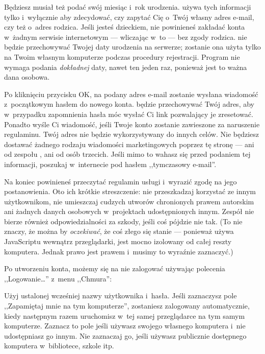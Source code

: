 \documentclass[a4paper]{report}
\begin{document}
Będziesz musiał też podać swój miesiąc i~rok urodzenia. \Snap{} używa tych informacji tylko i~wyłącznie aby zdecydować, czy zapytać Cię o~Twój własny adres e-mail, czy też o~adres rodzica. Jeśli jesteś dzieckiem, nie powinieneś zakładać konta w~żadnym serwisie internetowym --- wliczając w~to  --- bez zgody rodzica. \Snap{} nie będzie przechowywać Twojej daty urodzenia na serwerze; zostanie ona użyta tylko na Twoim własnym komputerze podczas procedury rejestracji. Program nie wymaga podania \emph{dokładnej} daty, nawet ten jeden raz, ponieważ jest to ważna dana osobowa.

Po kliknięciu przycisku OK, na podany adres e-mail zostanie wysłana wiadomość z~początkowym hasłem do nowego konta. \Snap{} będzie przechowywać Twój adres, aby w~przypadku zapomnienia hasła móc wysłać Ci link pozwalający je zresetować. Ponadto \Snap{} wyśle Ci wiadomość, jeśli Twoje konto zostanie zawieszone za naruszenie regulaminu. Twój adres nie będzie wykorzystywany do innych celów. Nie będziesz dostawać żadnego rodzaju wiadomości marketingowych poprzez tę stronę --- ani od zespołu , ani od osób trzecich. Jeśli mimo to wahasz się przed podaniem tej informacji, poszukaj w~internecie pod hasłem ,,tymczasowy e-mail''.

Na koniec powinieneś przeczytać regulamin usługi i~wyrazić zgodę na jego postanowienia. Oto ich krótkie streszczenie: nie przeszkadzaj korzystać ze  innym użytkownikom, nie umieszczaj cudzych utworów chronionych prawem autorskim ani żadnych danych osobowych w~projektach udostępnionych innym. Zespół  nie bierze również odpowiedzialności za szkody, jeśli coś pójdzie nie tak. (To nie znaczy, że można by \emph{oczekiwać}, że coś złego się stanie --- ponieważ \Snap{} używa JavaScriptu wewnątrz przeglądarki, jest mocno izolowany od całej reszty komputera. Jednak prawo jest prawem i~musimy to wyraźnie zaznaczyć.)

Po utworzeniu konta, możemy się na nie zalogować używając polecenia ,,Logowanie\ldots'' z~menu ,,Chmura'':\nopagebreak


Użyj ustalonej wcześniej nazwy użytkownika i~hasła. Jeśli zaznaczysz pole ,,Zapamiętaj mnie na tym komputerze'', zostaniesz zalogowany automatycznie, kiedy następnym razem uruchomisz  w~tej samej przeglądarce na tym samym komputerze. Zaznacz to pole jeśli używasz swojego własnego komputera i~nie udostępniasz go innym. Nie zaznaczaj go, jeśli używasz publicznie dostępnego komputera w~bibliotece, szkole itp.
\end{document}
